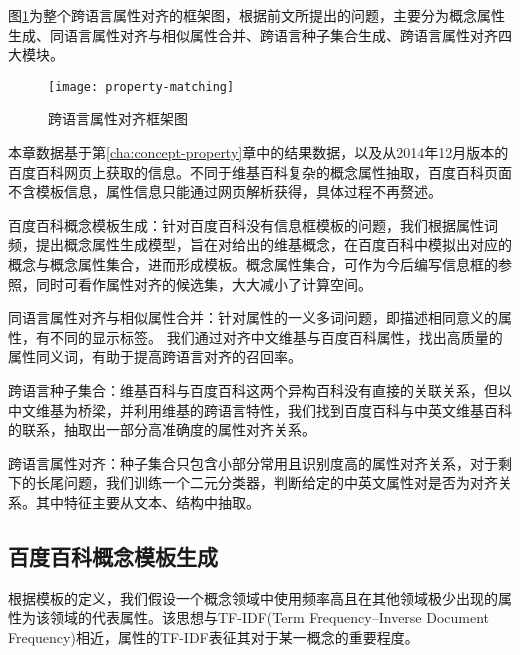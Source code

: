 图\ref{fig:property-matching}为整个跨语言属性对齐的框架图，根据前文所提出的问题，主要分为概念属性生成、同语言属性对齐与相似属性合并、跨语言种子集合生成、跨语言属性对齐四大模块。

\begin{figure}[h]
  \centering
  \texttt{[image: property-matching]}
  \caption{跨语言属性对齐框架图}
  \label{fig:property-matching}
\end{figure}

本章数据基于第\ref{cha:concept-property}章中的结果数据，以及从2014年12月版本的百度百科网页上获取的信息。不同于维基百科复杂的概念属性抽取，百度百科页面不含模板信息，属性信息只能通过网页解析获得，具体过程不再赘述。

{\heiti 百度百科概念模板生成：}针对百度百科没有信息框模板的问题，我们根据属性词频，提出概念属性生成模型，旨在对给出的维基概念，在百度百科中模拟出对应的概念与概念属性集合，进而形成模板。概念属性集合，可作为今后编写信息框的参照，同时可看作属性对齐的候选集，大大减小了计算空间。

{\heiti 同语言属性对齐与相似属性合并：}针对属性的一义多词问题，即描述相同意义的属性，有不同的显示标签。
我们通过对齐中文维基与百度百科属性，找出高质量的属性同义词，有助于提高跨语言对齐的召回率。

{\heiti 跨语言种子集合：}维基百科与百度百科这两个异构百科没有直接的关联关系，但以中文维基为桥梁，并利用维基的跨语言特性，我们找到百度百科与中英文维基百科的联系，抽取出一部分高准确度的属性对齐关系。

{\heiti 跨语言属性对齐：}种子集合只包含小部分常用且识别度高的属性对齐关系，对于剩下的长尾问题，我们训练一个二元分类器，判断给定的中英文属性对是否为对齐关系。其中特征主要从文本、结构中抽取。

\subsection{百度百科概念模板生成}
\label{sec:domain-template}
根据模板的定义，我们假设一个概念领域中使用频率高且在其他领域极少出现的属性为该领域的代表属性。该思想与TF-IDF(Term Frequency–Inverse Document Frequency)相近，属性的TF-IDF表征其对于某一概念的重要程度。

